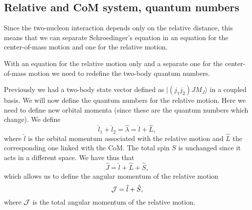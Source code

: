 \documentclass[%
twoside,                 %
final,                   %
10pt]{article}
\begin{document}
\subsection{Relative and CoM system, quantum numbers}
\begin{block}{}

Since the two-nucleon interaction depends only on the relative distance, this means that we can separate Schroedinger's equation in an equation for the center-of-mass motion and one for the relative motion.

With an equation for the relative motion only and a separate one for the center-of-mass motion we need to redefine the two-body quantum numbers.

Previously we had a two-body state vector defined as $|(j_1j_2)JM_J\rangle$ in a coupled basis. 
We will now define the quantum numbers for the relative motion. Here we need to define new orbital momenta (since these are the quantum numbers which change). 
We define 
\[
\hat{l}_1+\hat{l}_2=\hat{\lambda}=\hat{l}+\hat{L},
\]
where $\hat{l}$ is the orbital momentum associated with the relative motion and
$\hat{L}$ the corresponding one linked with the CoM. The total spin $S$ is unchanged since it acts in a different space. We have thus that
\[
\hat{J}=\hat{l}+\hat{L}+\hat{S},
\]
which allows us to define the angular momentum of the relative motion
\[
{ \cal J} =  \hat{l}+\hat{S},
\]
where ${ \cal J}$ is the total angular momentum of the relative motion.
\end{block}

\end{document}
